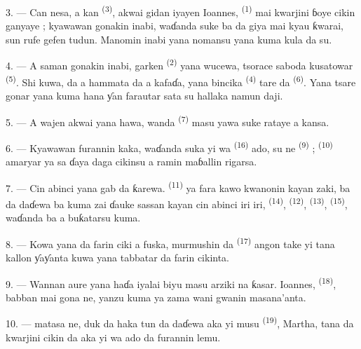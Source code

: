 3. --- Can nesa, a kan  \textsuperscript{(3)}, akwai gidan
iyayen Ioannes,  \textsuperscript{(1)} mai kwarjini ɓoye
cikin ganyaye ; kyawawan gonakin inabi, waɗanda suke ba da giya mai
kyau ƙwarai, sun rufe gefen tudun. Manomin inabi yana nomansu yana
kuma kula da su.

4. --- A saman gonakin inabi, garken 
\textsuperscript{(2)} yana wucewa, tsorace saboda kusatowar  \textsuperscript{(5)}. Shi kuwa, da  a
hammata da  a kafaɗa, yana bincika
 \textsuperscript{(4)} tare da 
\textsuperscript{(6)}. Yana tsare gonar yana kuma hana ƴan farautar
sata su hallaka namun daji.

5. --- A wajen  akwai  yana
hawa, wanda  \textsuperscript{(7)} masu yawa suke
rataye a kansa.

6. --- Kyawawan furannin kaka, waɗanda suka yi wa 
\textsuperscript{(16)} ado, su ne 
\textsuperscript{(9)} ;  \textsuperscript{(10)} amaryar
ya sa ɗaya daga cikinsu a ramin maɓallin rigarsa.

7. --- Cin abinci yana gab da ƙarewa. 
\textsuperscript{(11)} ya fara kawo kwanonin kayan zaki, ba da daɗewa
ba kuma zai ɗauke sassan kayan cin abinci iri iri, 
\textsuperscript{(14)},  \textsuperscript{(12)},
 \textsuperscript{(13)}, 
\textsuperscript{(15)}, waɗanda ba a buƙatarsu kuma.

\VUsaut{3.0mm}

8. --- Kowa yana da farin ciki a fuska, murmushin da 
\textsuperscript{(17)} angon take yi tana kallon ƴaƴanta kuwa yana
tabbatar da farin cikinta.

9. --- Wannan aure yana haɗa iyalai biyu masu arziki na ƙasar.
Ioannes,  \textsuperscript{(18)},  babban mai
gona ne, yanzu kuma ya zama  wani gwanin masana’anta.

10. ---  matasa ne, duk da haka tun da daɗewa aka
yi musu   \textsuperscript{(19)},
Martha, tana da kwarjini cikin  da aka yi wa ado
da furannin lemu.

